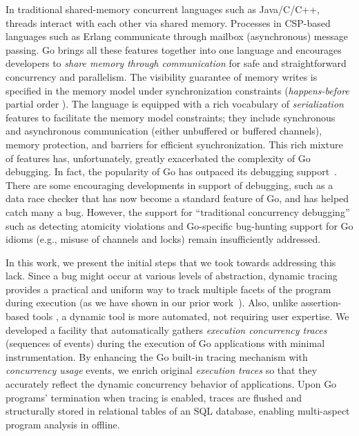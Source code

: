 In traditional shared-memory concurrent languages such as Java/C/C++, threads interact with each other via shared memory.
%
Processes in CSP-based languages such as Erlang communicate through mailbox (asynchronous) message passing.
%
Go brings all these features together into one language and encourages developers to \textit{share memory through communication} for safe and straightforward concurrency and parallelism.
%
The visibility guarantee of memory writes is specified in the memory model\cite{go-memModel} under synchronization constraints (\textit{happens-before} partial order \cite{lamport-hb-1978}).
%
The language is equipped with a rich vocabulary of \textit{serialization} features to facilitate the memory model constraints; they include synchronous and asynchronous communication (either unbuffered or buffered channels), memory protection, and barriers for efficient synchronization.
%
This rich mixture of features has, unfortunately, greatly exacerbated the complexity of Go debugging.
%
In fact, the popularity of Go has outpaced its debugging support~\cite{go-survey,tu-concurrentBugs-asplos19,yuan-gobench-cgo21}.
%
There are some encouraging developments in support of debugging, such as a data race checker \cite{go-race-blog} that has now become a standard feature of Go, and has helped catch many a bug.
%
However, the support for ``traditional concurrency debugging'' such as detecting atomicity violations and Go-specific bug-hunting support for Go idioms (e.g., misuse of channels and locks) remain insufficiently addressed.
%

 In
this work, we present the initial steps that we took towards addressing this lack.
%
Since a bug might
occur
at various levels of abstraction, dynamic tracing provides a practical and uniform way to track multiple facets of the program during execution (as we have shown in our prior work~\cite{difftrace}).
%
Also, unlike assertion-based tools \cite{lange-staticType-icse18,wolf-gobra-cav21}, a dynamic tool is more automated, not requiring user expertise.
%
We developed a facility that automatically gathers \textit{execution concurrency traces} (\ie sequences of events) during the execution of Go applications with minimal instrumentation.
%
By enhancing the Go built-in tracing mechanism with \textit{concurrency usage} events, we enrich original \textit{execution traces} so that they accurately reflect the dynamic concurrency behavior of applications.
%
Upon Go programs' termination when tracing is enabled, traces are flushed and structurally stored in relational tables of an SQL database, enabling multi-aspect program analysis in offline.
%

